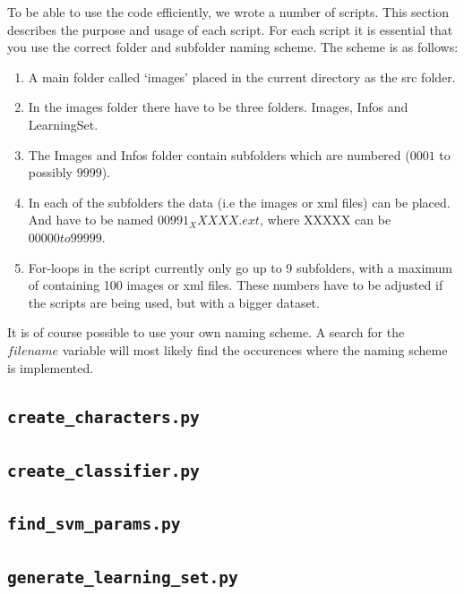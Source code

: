 \documentclass[a4paper]{article}
\begin{document}
To be able to use the code efficiently, we wrote a number of scripts. This
section describes the purpose and usage of each script. For each script it is
essential that you use the correct folder and subfolder naming scheme. The scheme
is as follows:

\begin{enumerate}
    \item A main folder called `images' placed in the current directory as the
    src folder.
    \item In the images folder there have to be three folders.  Images, Infos
    and LearningSet.
    \item The Images and Infos folder contain subfolders which are numbered
    ($0001$ to possibly $9999$).
    \item In each of the subfolders the data (i.e the images or xml files) can
    be placed.  And have to be named $00991_XXXXX.ext$, where XXXXX can be
    $00000 to 99999$.
    \item For-loops in the script currently only go up to 9 subfolders, with a
    maximum of containing 100 images or xml files. These numbers have to be
    adjusted if the scripts are being used, but with a bigger dataset.
\end{enumerate}

It is of course possible to use your own naming scheme. A search for the
$filename$ variable will most likely find the occurences where the naming
scheme is implemented.


\subsection*{\texttt{create\_characters.py}}



\subsection*{\texttt{create\_classifier.py}}



\subsection*{\texttt{find\_svm\_params.py}}



\subsection*{\texttt{generate\_learning\_set.py}}
\end{document}
